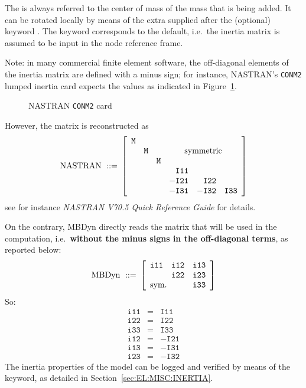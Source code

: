 The  is always referred to the center of mass of the
mass that is being added. It can be rotated locally by means of the extra
 supplied after the (optional) keyword .
The keyword  corresponds to the default, i.e.\ the inertia matrix
is assumed to be input in the node reference frame.

Note: in many commercial finite element software, the off-diagonal elements 
of the inertia matrix are defined with a minus sign; for instance, 
NASTRAN's \texttt{CONM2} lumped inertia card expects the values as indicated
in Figure~\ref{fig:el:body:CONM2}.
%
\begin{figure}[b]
\centering
\begin{minipage}{120mm}
\end{minipage}
\caption{NASTRAN \texttt{CONM2} card}
\label{fig:el:body:CONM2}
\end{figure}
%
However, the matrix is reconstructed as
\begin{displaymath}
	\mathrm{NASTRAN \ ::= } \ \sqbr{\matr{rrrrrr}{
		\texttt{M} & & & & & \\
		& \texttt{M} & & \multicolumn{3}{c}{\text{symmetric}} \\
		& & \texttt{M} & & & \\
		& & & \texttt{I11} & & \\
		& & & -\texttt{I21} & \texttt{I22} & \\
		& & & -\texttt{I31} & -\texttt{I32} & \texttt{I33}
	}}
\end{displaymath}
see for instance \emph{NASTRAN V70.5 Quick Reference Guide} for details.

\noindent
On the contrary, MBDyn directly reads the matrix 
that will be used in the computation, i.e.\ 
\textbf{without the minus signs in the off-diagonal terms},
as reported below:
\begin{displaymath}
	\mathrm{MBDyn \ ::= } \ \sqbr{\matr{ccc}{
		\texttt{i11} & \texttt{i12} & \texttt{i13} \\
		& \texttt{i22} & \texttt{i23} \\
		\multicolumn{2}{l}{\text{sym.}} & \texttt{i33}
	}}
\end{displaymath}
So:
\begin{eqnarray*}
	\texttt{i11} & = & \texttt{I11} \\
	\texttt{i22} & = & \texttt{I22} \\
	\texttt{i33} & = & \texttt{I33} \\
	\texttt{i12} & = & - \texttt{I21} \\
	\texttt{i13} & = & - \texttt{I31} \\
	\texttt{i23} & = & - \texttt{I32}
\end{eqnarray*}
The inertia properties of the model can be logged and verified
by means of the  keyword, as detailed
in Section~\ref{sec:EL:MISC:INERTIA}.

